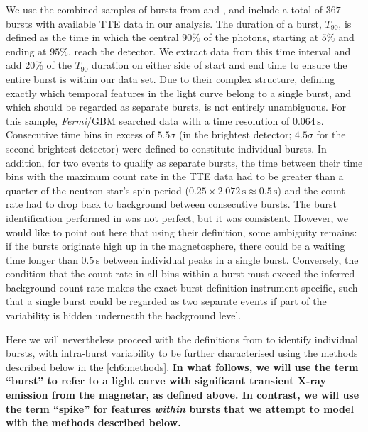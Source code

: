\documentclass[12pt]{emulateapj}
\newcommand{\project}[1]{\textsl{#1}}
\newcommand{\fermi}{\project{Fermi}}
\begin{document}
We use the combined samples of bursts from \citet{vonkienlin2012} and \citet{vanderhorst2012}, and include a total of $367$ bursts with available TTE data in our analysis. The duration of a burst, $T_{90}$, is defined as the time in which the central $90\%$ of the photons, starting at $5\%$ and ending at $95\%$, reach the detector.  We extract data from this time interval and add $20\%$ of the $T_{90}$ duration on either side of start and end time to ensure the entire burst is within our data set. Due to their complex structure, defining exactly which temporal features in the light curve belong to a single burst, and which should be regarded as separate bursts, is 
not entirely unambiguous. For this sample, \citet{vanderhorst2012} \fermi/GBM searched data with a time resolution of $0.064\,\mathrm{s}$. Consecutive time bins in excess of $5.5\sigma$ 
(in the brightest detector; $4.5\sigma$ for the second-brightest detector) were defined to constitute individual bursts. In addition, for two events to qualify as separate bursts, the time between their time bins with the maximum count rate in the TTE data had to be greater than a quarter of the neutron star's spin period ($0.25\times2.072\,\mathrm{s} \approx 0.5\,\mathrm{s}$) and the count rate had to drop back to background between consecutive bursts. 
The burst identification performed in \citet{vanderhorst2012} was not perfect, but it was consistent. However, we would like to point out here that using their definition, 
some ambiguity remains: if the bursts originate high up in the magnetosphere, there could be a waiting 
time longer than $0.5\,\mathrm{s}$ between individual peaks in a single burst. Conversely, the condition that the count rate in all bins within a burst must
exceed the inferred background count rate makes the exact burst definition instrument-specific, such that a single burst could be regarded as two separate events
if part of the variability is hidden underneath the background level.

Here we will nevertheless proceed with the definitions from \citet{vanderhorst2012} to identify individual bursts, with intra-burst variability to be further characterised using the 
methods described below in the \ref{ch6:methods}. {\bf In what follows, we will use the term ``burst'' to refer to a light curve with significant transient X-ray emission from the magnetar, as defined above. In contrast, we will use the term ``spike'' for features {\it within} bursts that we attempt to model with the methods described below.} 
\end{document}
